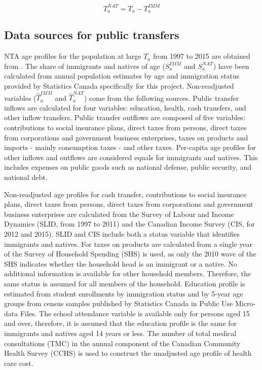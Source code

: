 \begin{equation}\label{eq:nat}
 {T}^{NAT}_a ={T}_a -{T}^{IMM}_a
\end{equation}

\subsection*{Data sources for public transfers}

NTA age profiles for the population at large \({T}_a \) from 1997 to 2015 are obtained from  \citet{Merette:2019kz}.
The share of immigrants and natives of age (\( S^{IMM}_a \) and \( S^{NAT}_a \)) have been calculated from annual population estimates by age and immigration status provided by Statistics Canada specifically for this project.
Non-readjusted variables (\(\hat{T}^{IMM}_a \) and \(\hat{T}^{NAT}_a \)) come from the following sources.
Public transfer inflows are calculated for four variables: education, health, cash transfers, and other inflow transfers.
Public transfer outflows are composed of five variables: contributions to social insurance plans, direct taxes from persons, direct taxes from corporations and government business enterprises, taxes on products and imports - mainly consumption taxes - and other taxes.
Per-capita age profiles for other inflows and outflows are considered equals for immigrants and natives. This includes expenses on public goods such as national defense, public security, and national debt.

\vspace{0.7em}\par
Non-readjusted age profiles for cash transfer, contributions to social insurance plans, direct taxes from persons, direct taxes from corporations and government business enterprises are calculated from the Survey of Labour and Income Dynamics (SLID, from 1997 to 2011) and the Canadian Income Survey (CIS, for 2012 and 2015).
SLID and CIS include both a status variable that identifies immigrants and natives.
For taxes on products are calculated from a single year of the Survey of Household Spending (SHS) is used, as only the 2010 wave of the SHS indicates whether the household head is an immigrant or a native.
No additional information is available for other household members.
Therefore, the same status is assumed for all members of the household.
Education profile is estimated from student enrollments by immigration status and by 5-year age groups from census samples published by Statistics Canada in Public Use Micro-data Files. The school attendance variable is available only for persons aged 15 and over, therefore, it is assumed that the education profile is the same for immigrants and natives aged 14 years or less.
The number of total medical consultations (TMC) in the annual component of the Canadian Community Health Survey (CCHS) is used to construct the unadjusted age profile of health care cost.

